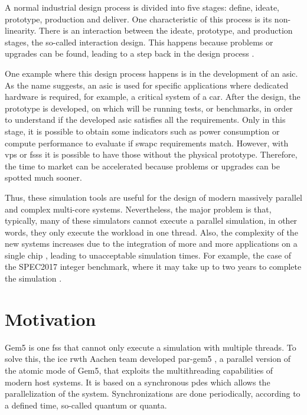 
A normal industrial design process is divided into five stages: define, ideate, prototype, production and deliver. One characteristic of this 
process is its non-linearity. There is an interaction between the ideate, prototype, and production stages, the so-called interaction design. This 
happens because problems or upgrades can be found, leading to a step back in the design process \cite{ProductDesignSteps}.

One example where this design process happens is in the development of an \gls{asic}. As the name suggests, an \gls{asic} is used for specific 
applications where dedicated hardware is required, for example, a critical system of a car. After the design, the prototype is developed, on 
which will be running tests, or benchmarks, in order to understand if the developed \gls{asic} satisfies all the requirements. Only in this stage, 
it is possible to obtain some indicators such as power consumption or compute performance to evaluate if \gls{swapc} requirements match. However, 
with \glspl{vp} or \glspl{fss} it is possible to have those without the physical prototype. Therefore, the time to market can be accelerated 
because problems or upgrades can be spotted much sooner.

Thus, these simulation tools are useful for the design of modern massively parallel and complex multi-core systems. Nevertheless, the major 
problem is that, typically, many of these simulators cannot execute a parallel simulation, in other words, they only execute the workload in one 
thread. Also, the complexity of the new systems increases due to the integration of more and more applications on a single chip 
\cite{terascaleComputing}, leading to unacceptable simulation times. For example, the case of the SPEC2017 integer benchmark, where it may 
take up to two years to complete the simulation \cite{pargem5}.

\section{Motivation}

Gem5 is one \gls{fss} that cannot only execute a simulation with multiple threads. To solve this, the \gls{ice} \gls{rwth} Aachen team developed 
par-gem5 \cite{pargem5}, a parallel version of the atomic mode of Gem5, that exploits the multithreading capabilities of modern host systems. 
It is based on a synchronous \gls{pdes} which allows the parallelization of the system. Synchronizations are done periodically, according to a 
defined time, so-called quantum or quanta.

